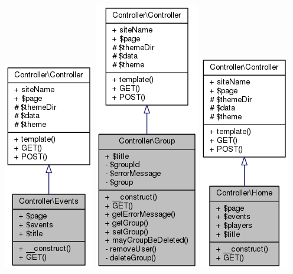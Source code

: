 \documentclass[11pt]{article}
\begin{document}
\includegraphics[scale=0.4]{UML_Controller_1_1Events.png}
\includegraphics[scale=0.4]{UML_Controller_1_1Group.png}
\includegraphics[scale=0.4]{UML_Controller_1_1Home.png}
\end{document}
